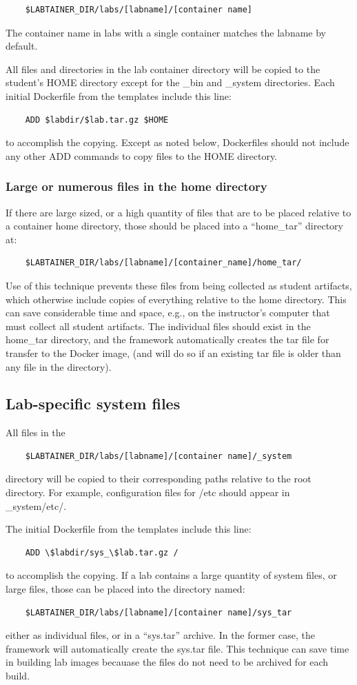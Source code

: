 \documentclass[12pt]{article}
\begin{document}
\begin{verbatim}
    $LABTAINER_DIR/labs/[labname]/[container name]
\end{verbatim}
The container name in labs with a single container matches the labname by default.

All files and directories in the lab container directory will be copied to the student's HOME
directory except for the \_bin and \_system directories.
Each initial Dockerfile from the templates include this line:
\begin{verbatim}
    ADD $labdir/$lab.tar.gz $HOME
\end{verbatim}
to accomplish the copying. Except as noted below, Dockerfiles should not include any other ADD commands
to copy files to the HOME directory.
\subsubsection{Large or numerous files in the home directory} \label{large files}
If there are large sized, or a high quantity of files that are to be placed relative to a 
container home directory, those should be placed into a ``home\_tar'' directory at:
\begin{verbatim}
    $LABTAINER_DIR/labs/[labname]/[container_name]/home_tar/
\end{verbatim}
\noindent Use of this technique prevents these files from being collected as student artifacts, which
otherwise include copies of everything relative to the home directory.  This
can save considerable time and space, e.g., on the instructor's computer that must collect
all student artifacts.
The individual files should exist in the home\_tar directory, and the framework automatically
creates the tar file for transfer to the Docker image, (and will do so if an existing tar file
is older than any file in the directory).


\subsection{Lab-specific system files}
All files in the
\begin{verbatim}
    $LABTAINER_DIR/labs/[labname]/[container name]/_system
\end{verbatim}
directory will be copied to their corresponding paths relative to the root directory.
For example, configuration files for /etc should appear in \_system/etc/.

The initial Dockerfile from the templates include this line:
\begin{verbatim}
    ADD \$labdir/sys_\$lab.tar.gz /
\end{verbatim}
\noindent to accomplish the copying. 
If a lab contains a large quantity of system files, or large files, those
can be placed into the directory named:
\begin{verbatim}
    $LABTAINER_DIR/labs/[labname]/[container name]/sys_tar
\end{verbatim}
either as individual files, or in a ``sys.tar'' archive.  In the former case,
the framework will automatically create the sys.tar file.  This technique 
can save time in building lab images becauase the files do not need to be 
archived for each build.  
\end{document}
